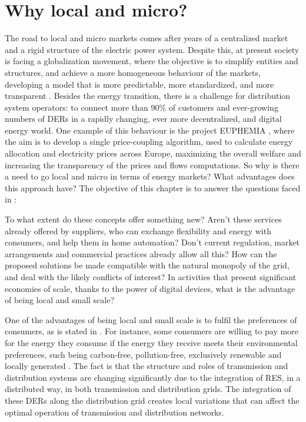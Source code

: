\section{Why local and micro?} \label{sec:why}
The road to local and micro markets comes after years of a centralized market and a rigid structure of the electric power system. Despite this, at present society is facing a globalization movement, where the objective is to simplify entities and structures, and achieve a more homogeneous behaviour of the markets, developing a model that is more predictable, more standardized, and more transparent \cite{Mallet2014}. Besides the energy transition, there is a challenge for distribution system operators: to connect more than 90\% of customers and ever-growing numbers of DERs in a rapidly changing, ever more decentralized, and digital energy world. One
example of this behaviour is the project EUPHEMIA \cite{EUPHEMIA2016}, where the aim is to develop a single price-coupling algorithm, used to calculate energy allocation and electricity prices across Europe, maximizing the overall welfare and increasing the transparency of the prices and flows computations. So why is there a need to go local and micro in terms of energy markets? What advantages does this approach have? The objective of this chapter is to answer the questions faced in \cite{DesignElectricityMarketRossetoo2017}:

\begin{tcolorbox}
To what extent do these concepts offer something new? Aren't these services already offered by suppliers, who can exchange flexibility and energy with consumers, and help them in home automation? Don't current regulation, market arrangements and commercial
practices already allow all this? How can the proposed solutions be made compatible with the natural monopoly of the grid, and deal with the likely conflicts of interest? In activities that present significant economies of scale, thanks to the power of digital devices, what is the advantage of being local and small scale?
\end{tcolorbox}

One of the advantages of being local and small scale is to fulfil the preferences of consumers, as is stated in \cite{faber2014micro}. For instance, some consumers are willing to pay more for the energy they consume if the energy they receive meets their environmental preferences, such being carbon-free, pollution-free, exclusively renewable and locally generated \cite{lane2013costing}. The fact is that the structure and roles of transmission and distribution systems are changing significantly due to the integration of RES, in a distributed way, in both transmission and distribution grids. The integration of these DERs along the distribution grid creates local variations that can affect the optimal operation of transmission and distribution networks.

